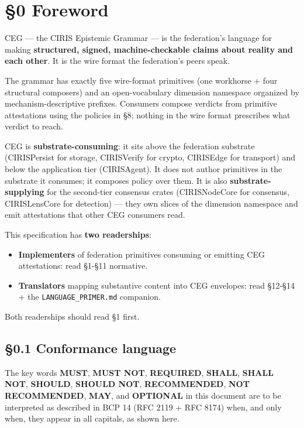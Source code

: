 \documentclass[10pt]{article}
\begin{document}
\section*{§0 Foreword}


CEG — the CIRIS Epistemic Grammar — is the federation's language for making \textbf{structured, signed, machine-checkable claims about reality and each other}. It is the wire format the federation's peers speak.


The grammar has exactly five wire-format primitives (one workhorse + four structural composers) and an open-vocabulary dimension namespace organized by mechanism-descriptive prefixes. Consumers compose verdicts from primitive attestations using the policies in §8; nothing in the wire format prescribes what verdict to reach.


CEG is \textbf{substrate-consuming}: it sits above the federation substrate (CIRISPersist for storage, CIRISVerify for crypto, CIRISEdge for transport) and below the application tier (CIRISAgent). It does not author primitives in the substrate it consumes; it composes policy over them. It is also \textbf{substrate-supplying} for the second-tier consensus crates (CIRISNodeCore for consensus, CIRISLensCore for detection) — they own slices of the dimension namespace and emit attestations that other CEG consumers read.


This specification has \textbf{two readerships}:

\begin{itemize}\setlength\itemsep{0pt}
\item \textbf{Implementers} of federation primitives consuming or emitting CEG attestations: read §1-§11 normative.
\item \textbf{Translators} mapping substantive content into CEG envelopes: read §12-§14 + the \texttt{LANGUAGE\_PRIMER.md} companion.
\end{itemize}


Both readerships should read §1 first.



\subsection*{§0.1 Conformance language}


The key words \textbf{MUST}, \textbf{MUST NOT}, \textbf{REQUIRED}, \textbf{SHALL}, \textbf{SHALL NOT}, \textbf{SHOULD}, \textbf{SHOULD NOT}, \textbf{RECOMMENDED}, \textbf{NOT RECOMMENDED}, \textbf{MAY}, and \textbf{OPTIONAL} in this document are to be interpreted as described in BCP 14 (RFC 2119 + RFC 8174) when, and only when, they appear in all capitals, as shown here.
\end{document}
